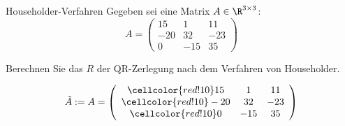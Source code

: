 \begin{example}{Householder-Verfahren}
    Gegeben sei eine Matrix $A \in \R^{3 \times 3}$:
    \[
        A =
        \left(
        \begin{array}{cccc}
                15  & 1   & 11  \\ 
                -20 & 32  & -23 \\ 
                0   & -15 & 35
            \end{array}
        \right)
    \]
    
    Berechnen Sie das $R$ der QR-Zerlegung nach dem Verfahren von Householder.
    
    \exampleseparator
    
    \footnotesize
    
    \[
        \tilde{A} := A =
        \left(
        \begin{array}{cccc}
                \cellcolor{red!10} 15  & 1   & 11  \\ 
                \cellcolor{red!10} -20 & 32  & -23 \\ 
                \cellcolor{red!10} 0   & -15 & 35
            \end{array}
        \right)
    \]
    

\end{example}
